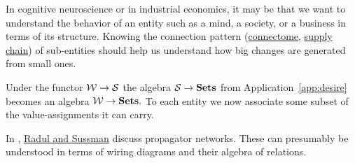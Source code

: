 \documentclass[CT4S-EN-RU]{subfiles}
\begin{document}
\begin{exampleRUS}
\end{exampleRUS}

\begin{applicationENG}
In cognitive neuroscience or in industrial economics, it may be that we want to understand the behavior of an entity such as a mind, a society, or a business in terms of its structure. Knowing the connection pattern (\href{http://en.wikipedia.org/wiki/Connectome}{connectome}, \href{http://en.wikipedia.org/wiki/Supply_chain}{supply chain}) of sub-entities should help us understand how big changes are generated from small ones.

Under the functor $\mathcal{W}\rightarrow\mathcal{S}$ the algebra $\mathcal{S}\rightarrow{\mathbf{Sets}}$ from Application~\ref{app:desire} becomes an algebra $\mathcal{W}\rightarrow{\mathbf{Sets}}.$ To each entity we now associate some subset of the value-assignments it can carry. 
\end{applicationENG}

\begin{applicationRUS}
\end{applicationRUS}

\begin{applicationENG}
In \cite{RS}, \href{http://dspace.mit.edu/bitstream/handle/1721.1/44215/MIT-CSAIL-TR-2009-002.pdf?sequence=1}{Radul and Sussman} discuss propagator networks. These can presumably be understood in terms of wiring diagrams and their algebra of relations.
\end{applicationENG}
 
\begin{applicationRUS}
\end{applicationRUS}
\end{document}
